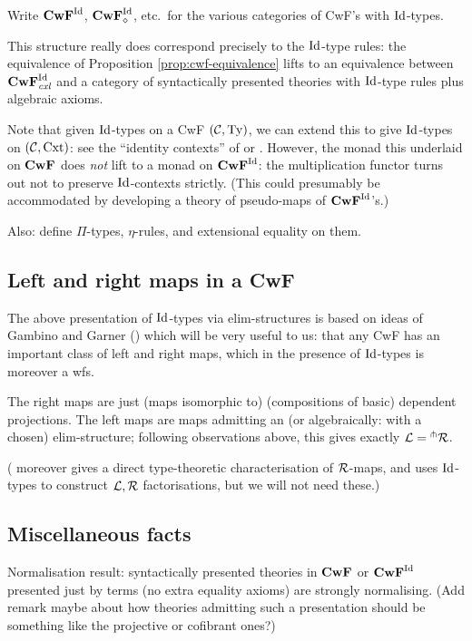 \documentclass{amsart}
\begin{document}
Write $\mathbf{CwF}^{\mathrm{Id}}$, $\mathbf{CwF}_\diamond^{\mathrm{Id}}$, etc.\ for the various categories of CwF's with $\mathrm{Id}$-types.  

\begin{proposition} This structure really does correspond precisely to the $\mathrm{Id}$-type rules: the equivalence of Proposition \ref{prop:cwf-equivalence} lifts to an equivalence between $\mathbf{CwF}^{\mathrm{Id}}_{\mathit{cxl}}$ and a category of syntactically presented theories with $\mathrm{Id}$-type rules plus algebraic axioms. 
\end{proposition}

Note that given $\mathrm{Id}$-types on a CwF $(\mathcal{C},\mathrm{Ty})$, we can extend this to give $\mathrm{Id}$-types on $(\mathcal{C},\mathrm{Cxt})$: see the ``identity contexts'' of \cite{streicher:habilitationsthesis} or \cite{gambino-garner}.  However, the monad this underlaid on $\mathbf{CwF}$ does \emph{not} lift to a monad on $\mathbf{CwF}^{\mathrm{Id}}$: the multiplication functor turns out not to preserve $\mathrm{Id}$-contexts strictly.  (This could presumably be accommodated by developing a theory of pseudo-maps of $\mathbf{CwF}^{\mathrm{Id}}$'s.)

Also: define $\Pi$-types, $\eta$-rules, and extensional equality on them. 

\subsection{Left and right maps in a CwF} \label{subsec:left-right-in-cwf}
The above presentation of $\mathrm{Id}$-types via elim-structures is based on ideas of Gambino and Garner (\cite{gambino-garner}) which will be very useful to us: that any CwF has an important class of left and right maps, which in the presence of $\mathrm{Id}$-types is moreover a wfs.

The right maps are just (maps isomorphic to) (compositions of basic) dependent projections.  The left maps are maps admitting an (or algebraically: with a chosen) elim-structure; following observations above, this gives exactly $\mathcal{L} = {}^\pitchfork \mathcal{R}$.  

(\cite{gambino-garner} moreover gives a direct type-theoretic characterisation of $\mathcal{R}$-maps, and uses $\mathrm{Id}$-types to construct $\mathcal{L},\mathcal{R}$ factorisations, but we will not need these.)

\subsection{Miscellaneous facts}

Normalisation result: syntactically presented theories in $\mathbf{CwF}$ or $\mathbf{CwF}^{\mathrm{Id}}$ presented just by terms (no extra equality axioms) are strongly normalising.  (Add remark maybe about how theories admitting such a presentation should be something like the projective or cofibrant ones?)
\end{document}
